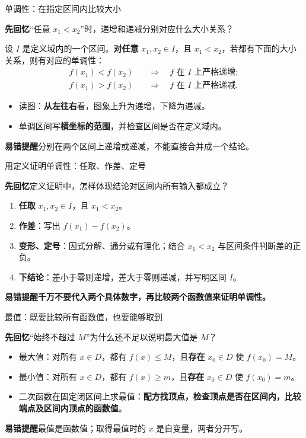 \documentclass[UTF8,10pt,aspectratio=169]{ctexbeamer}
\newcommand{\Recall}[1]{\par\noindent\textcolor{KnowledgeBlue}{\textbf{先回忆}\quad #1}\par\vspace{0.3cm}}
\newcommand{\Pitfall}[1]{\par\vspace{0.22cm}\noindent\textbf{易错提醒}\quad #1\par}
\begin{document}
\begin{frame}[t]{单调性：在指定区间内比较大小}
\large
\Recall{“任意 $x_1<x_2$”时，递增和递减分别对应什么大小关系？}
\pause
设 $I$ 是定义域内的一个区间。\textbf{对任意} $x_1,x_2\in I$，且 $x_1<x_2$，若都有下面的大小关系，则有对应的单调性：
\[
\begin{aligned}
 f(x_1)<f(x_2)&\quad\Longrightarrow\quad f\text{ 在 }I\text{ 上严格递增};\\[0.25em]
 f(x_1)>f(x_2)&\quad\Longrightarrow\quad f\text{ 在 }I\text{ 上严格递减}.
\end{aligned}
\]
\begin{itemize}
  \item 读图：\textbf{从左往右}看，图象上升为递增，下降为递减。
  \item 单调区间写\textbf{横坐标的范围}，并检查区间是否在定义域内。
\end{itemize}
\Pitfall{分别在两个区间上递增或递减，不能直接合并成一个结论。}
\end{frame}

\begin{frame}[t]{用定义证明单调性：任取、作差、定号}
\large
\Recall{定义证明中，怎样体现结论对区间内所有输入都成立？}
\pause
\begin{enumerate}
  \item \textbf{任取} $x_1,x_2\in I$，且 $x_1<x_2$。
  \item \textbf{作差}：写出 $f(x_1)-f(x_2)$。
  \item \textbf{变形、定号}：因式分解、通分或有理化；结合 $x_1<x_2$ 与区间条件判断差的正负。
  \item \textbf{下结论}：差小于零则递增，差大于零则递减，并写明区间 $I$。
\end{enumerate}
\Pitfall{\textbf{千万不要代入两个具体数字，再比较两个函数值来证明单调性。}}
\end{frame}

\begin{frame}[t]{最值：既要比较所有函数值，也要能够取到}
\large
\Recall{“始终不超过 $M$”为什么还不足以说明最大值是 $M$？}
\pause
\begin{itemize}
  \item 最大值：对所有 $x\in D$，都有 $f(x)\le M$，且\textbf{存在} $x_0\in D$ 使 $f(x_0)=M$。
  \item 最小值：对所有 $x\in D$，都有 $f(x)\ge m$，且\textbf{存在} $x_0\in D$ 使 $f(x_0)=m$。
  \item 二次函数在固定闭区间上求最值：\textbf{配方找顶点，检查顶点是否在区间内，比较端点及区间内顶点的函数值}。
\end{itemize}
\Pitfall{最值是函数值；取得最值时的 $x$ 是自变量，两者分开写。}
\end{frame}
\end{document}
